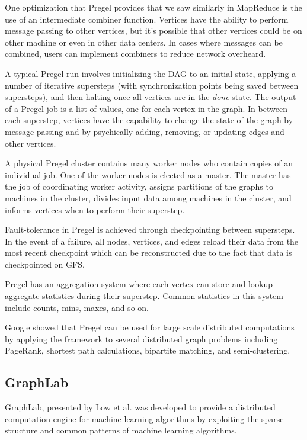 \documentclass[]{article}
\begin{document}
One optimization that Pregel provides that we saw similarly in MapReduce is the use of an intermediate combiner function. Vertices have the ability to perform message passing to other vertices, but it's possible that other vertices could be on other machine or even in other data centers. In cases where messages can be combined, users can implement combiners to reduce network overheard.

A typical Pregel run involves initializing the DAG to an initial state, applying a number of iterative supersteps (with synchronization points being saved between supersteps), and then halting once all vertices are in the \textit{done} state. The output of a Pregel job is a list of values, one for each vertex in the graph. In between each superstep, vertices have the capability to change the state of the graph by message passing and by psychically adding, removing, or updating edges and other vertices.

A physical Pregel cluster contains many worker nodes who contain copies of an individual job. One of the worker nodes is elected as a master. The master has the job of coordinating worker activity, assigns partitions of the graphs to machines in the cluster, divides input data among machines in the cluster, and informs vertices when to perform their superstep.

Fault-tolerance in Pregel is achieved through checkpointing between supersteps. In the event of a failure, all nodes, vertices, and edges reload their data from the most recent checkpoint which can be reconstructed due to the fact that data is checkpointed on GFS. 

Pregel has an aggregation system where each vertex can store and lookup aggregate statistics during their superstep. Common statistics in this system include counts, mins, maxes, and so on.

Google showed that Pregel can be used for large scale distributed computations by applying the framework to several distributed graph problems including PageRank, shortest path calculations, bipartite matching, and semi-clustering.

\subsection{GraphLab}\label{ssec:graphlab}
GraphLab, presented by Low et al.\cite{low2012distributed} was developed to provide a distributed computation engine for machine learning algorithms by exploiting the sparse structure and common patterns of machine learning algorithms. 
\end{document}
